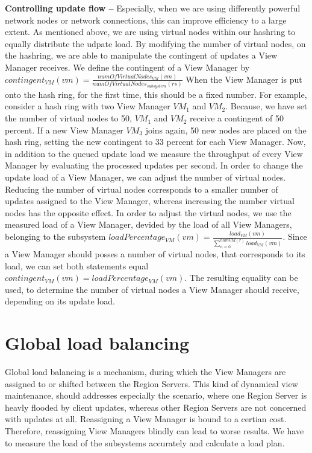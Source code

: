 \documentclass[11pt,a4paper,bibtotoc,idxtotoc,headsepline,footsepline,footexclude,BCOR12mm,DIV13]{scrbook}
\begin{document}
\noindent  
\textbf{Controlling update flow -- } Especially, when we are using differently powerful network nodes or network connections, this can improve efficiency to a large extent. As mentioned above, we are using virtual nodes within our hashring to equally distribute the udpate load. By modifying the number of virtual nodes, on the hashring, we are able to manipulate the contingent of updates a View Manager receives. We define the contingent of a View Manager by 
$contingent_{VM}(vm)=\frac{numOfVirtualNodes_{VM}(vm)}{numOfVirtualNodes_{subsystem}(rs)}$ 
When the View Manager is put onto the hash ring, for the first time, this should be a fixed number. For example, consider a hash ring with two View Manager $VM_1$ and $VM_2$. Because, we have set the number of virtual nodes to 50, $VM_1$ and $VM_2$ receive a contingent of 50 percent. If a new View Manager $VM_3$ joins again, 50 new nodes are placed on the hash ring, setting the new contingent to 33 percent for each View Manager. Now, in addition to the queued update load we measure the throughput of every View Manager by evaluating the processed updates per second. In order to change the update load of a View Manager, we can adjust the number of virtual nodes. Reducing the number of virtual nodes corresponds to a smaller number of updates assigned to the View Manager, whereas increasing the number virtual nodes has the opposite effect. In order to adjust the virtual nodes, we use the measured load  of a View Manager, devided by the load of all View Managers, belonging to the subsystem 
$loadPercentage_{VM}(vm)=\frac{load_{VM}(vm)}{\sum_{n=0}^{numVM(r)}load_{VM}(vm)}$. 
Since a View Manager should posses a number of virtual nodes, that corresponds to its load, we can set both statements equal $contingent_{VM}(vm)=loadPercentage_{VM}(vm)$. The resulting equality can be used, to determine the number of virtual nodes a View Manager should receive, depending on its update load.

\section{Global load balancing}

Global load balancing is a mechanism, during which the View Managers are assigned to or shifted between the Region Servers. This kind of dynamical view maintenance, should addresses especially the scenario, where one Region Server is heavly flooded by client updates, whereas other Region Servers are not concerned with updates at all. Reassigning a View Manager is bound to a certian cost. Therefore, reassigning View Managers blindly can lead to worse results. We have to measure the load of the subsystems accurately and calculate a load plan.\\ 
\end{document}
